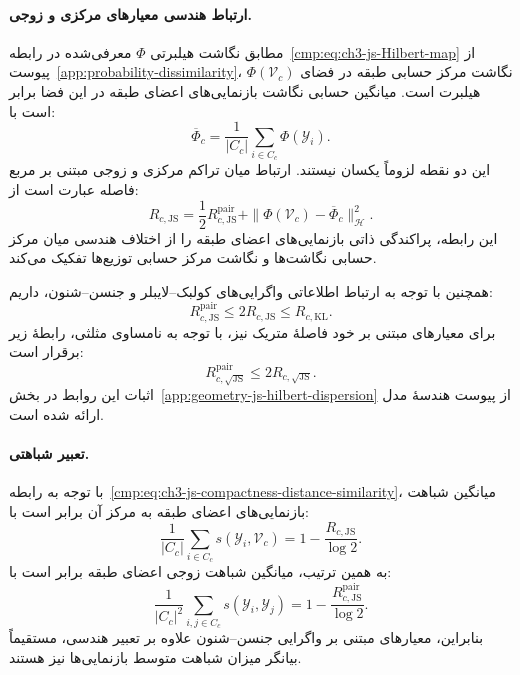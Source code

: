 \paragraph{ارتباط هندسی معیارهای مرکزی و زوجی.}
مطابق نگاشت هیلبرتی $\Phi$ معرفی‌شده در
رابطه~\eqref{cmp:eq:ch3-js-Hilbert-map} از
پیوست~\ref{app:probability-dissimilarity}،
$\Phi(\mathcal V_c)$ نگاشت مرکز حسابی طبقه در فضای
هیلبرت است. میانگین حسابی نگاشت بازنمایی‌های اعضای
طبقه در این فضا برابر است با:
\begin{equation}\label{cmp:eq:ch3-js-hilbert-mean}
\overline{\Phi}_c=\frac1{|C_c|}\sum_{i\in C_c}
\Phi(\mathscr Y_i).
\end{equation}
این دو نقطه لزوماً یکسان نیستند. ارتباط میان تراکم
مرکزی و زوجی مبتنی بر مربع فاصله عبارت است از:
\begin{equation}\label{cmp:eq:ch3-js-hilbert-dispersion-decomposition}
\boxed{R_{c,\mathrm{JS}}=\frac12R_{c,\mathrm{JS}}^{\mathrm{pair}}
+\|\Phi(\mathcal V_c)-\overline{\Phi}_c\|_{\mathcal H}^{2}.}
\end{equation}
این رابطه، پراکندگی ذاتی بازنمایی‌های اعضای طبقه را
از اختلاف هندسی میان مرکز حسابی نگاشت‌ها و نگاشت
مرکز حسابی توزیع‌ها تفکیک می‌کند.

همچنین با توجه به ارتباط اطلاعاتی واگرایی‌های
کولبک--لایبلر و جنسن--شنون، داریم:
\begin{equation}\label{cmp:eq:ch3-js-compactness-chain}
\boxed{
R_{c,\mathrm{JS}}^{\mathrm{pair}}
\le 2R_{c,\mathrm{JS}}
\le R_{c,\mathrm{KL}}.
}
\end{equation}
برای معیارهای مبتنی بر خود فاصلهٔ متریک نیز، با توجه
به نامساوی مثلثی، رابطهٔ زیر برقرار است:
\begin{equation}\label{cmp:eq:ch3-js-root-pair-inequality}
\boxed{R_{c,\sqrt{\mathrm{JS}}}^{\mathrm{pair}}
\le 2R_{c,\sqrt{\mathrm{JS}}}.}
\end{equation}
اثبات این روابط در بخش~\ref{app:geometry-js-hilbert-dispersion}
از پیوست هندسهٔ مدل ارائه شده است.

\paragraph{تعبیر شباهتی.}
با توجه به رابطه~\eqref{cmp:eq:ch3-js-compactness-distance-similarity}،
میانگین شباهت بازنمایی‌های اعضای طبقه به مرکز آن
برابر است با:
\begin{equation}\label{cmp:eq:ch3-js-central-similarity}
\frac1{|C_c|}\sum_{i\in C_c}s(\mathscr Y_i,\mathcal V_c)
=1-\frac{R_{c,\mathrm{JS}}}{\log2}.
\end{equation}
به همین ترتیب، میانگین شباهت زوجی اعضای طبقه
برابر است با:
\begin{equation}\label{cmp:eq:ch3-js-pair-similarity}
\frac1{|C_c|^2}\sum_{i,j\in C_c}s(\mathscr Y_i,\mathscr Y_j)
=1-\frac{R_{c,\mathrm{JS}}^{\mathrm{pair}}}{\log2}.
\end{equation}
بنابراین، معیارهای مبتنی بر واگرایی جنسن--شنون علاوه
بر تعبیر هندسی، مستقیماً بیانگر میزان شباهت متوسط
بازنمایی‌ها نیز هستند.

